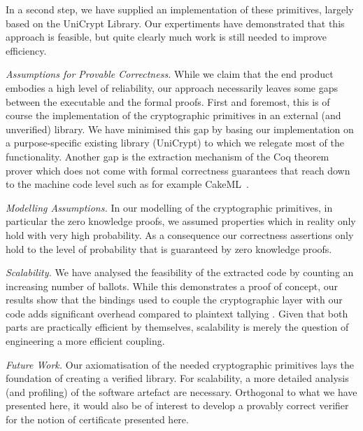 In a second step, we have supplied an implementation of these
primitives, largely based on the UniCrypt Library. Our expertiments
have demonstrated that this approach is feasible, but quite clearly
much work is still needed to improve efficiency. 

\smallskip\noindent\emph{Assumptions for Provable Correctness.}
While we claim that the end product embodies a high level of
reliability, our approach necessarily leaves some gaps between the
executable and the formal proofs. First and foremost, this is of
course the implementation of the cryptographic primitives in an
external (and unverified) library. We have minimised this gap by
basing our implementation on a purpose-specific existing library
(UniCrypt) to which we relegate most of the functionality. Another
gap is the extraction mechanism of the Coq theorem prover which does
not come with formal correctness guarantees that reach down to the
machine code level such as for example CakeML~\cite{Kumar:2014:CVI}.

\smallskip\noindent\emph{Modelling Assumptions.} In our modelling of
the cryptographic primitives, in particular the zero knowledge
proofs, we assumed properties which in reality only hold with
very high probability. As a
consequence our correctness assertions only hold to the level
of probability that is guaranteed by zero knowledge proofs.

\smallskip\noindent\emph{Scalability.} We have analysed the
feasibility of the extracted code by counting an increasing number
of ballots. While this demonstrates a proof of concept, our results
show that the bindings used to couple the cryptographic layer with
our code adds significant overhead compared
to plaintext tallying \cite{Pattinson:2017:SVE}. Given that both
parts are practically efficient by themselves, scalability is merely
the question of engineering a more efficient coupling. 

\smallskip\noindent\emph{Future Work.} Our axiomatisation of the
needed cryptographic primitives lays the foundation of creating a
verified library. For scalability, a more detailed analysis (and
profiling) of the software artefact are necessary. Orthogonal to
what we have presented here, it would also be of interest to develop
a provably correct verifier for the notion of certificate presented
here. 

%
%
